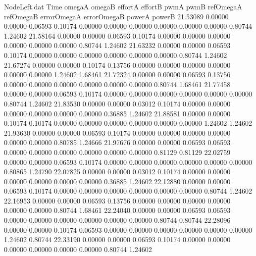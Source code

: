 \begin{filecontents}{NodeLeft.dat}
Time omegaA omegaB effortA effortB pwmA pwmB refOmegaA refOmegaB errorOmegaA errorOmegaB powerA powerB
  21.53089    0.00000    0.00000     0.06593    0.10174    0.00000    0.00000    0.00000    0.00000    0.00000    0.00000    0.80744    1.24602
  21.58164    0.00000    0.00000     0.06593    0.10174    0.00000    0.00000    0.00000    0.00000    0.00000    0.00000    0.80744    1.24602
  21.63232    0.00000    0.00000     0.06593    0.10174    0.00000    0.00000    0.00000    0.00000    0.00000    0.00000    0.80744    1.24602
  21.67274    0.00000    0.00000     0.10174    0.13756    0.00000    0.00000    0.00000    0.00000    0.00000    0.00000    1.24602    1.68461
  21.72324    0.00000    0.00000     0.06593    0.13756    0.00000    0.00000    0.00000    0.00000    0.00000    0.00000    0.80744    1.68461
  21.77458    0.00000    0.00000     0.06593    0.10174    0.00000    0.00000    0.00000    0.00000    0.00000    0.00000    0.80744    1.24602
  21.83530    0.00000    0.00000     0.03012    0.10174    0.00000    0.00000    0.00000    0.00000    0.00000    0.00000    0.36885    1.24602
  21.88581    0.00000    0.00000     0.10174    0.10174    0.00000    0.00000    0.00000    0.00000    0.00000    0.00000    1.24602    1.24602
  21.93630    0.00000    0.00000     0.06593    0.10174    0.00000    0.00000    0.00000    0.00000    0.00000    0.00000    0.80785    1.24666
  21.97676    0.00000    0.00000     0.06593    0.06593    0.00000    0.00000    0.00000    0.00000    0.00000    0.00000    0.81129    0.81129
  22.02759    0.00000    0.00000     0.06593    0.10174    0.00000    0.00000    0.00000    0.00000    0.00000    0.00000    0.80865    1.24790
  22.07825    0.00000    0.00000     0.03012    0.10174    0.00000    0.00000    0.00000    0.00000    0.00000    0.00000    0.36885    1.24602
  22.12880    0.00000    0.00000     0.06593    0.10174    0.00000    0.00000    0.00000    0.00000    0.00000    0.00000    0.80744    1.24602
  22.16953    0.00000    0.00000     0.06593    0.13756    0.00000    0.00000    0.00000    0.00000    0.00000    0.00000    0.80744    1.68461
  22.24040    0.00000    0.00000     0.06593    0.06593    0.00000    0.00000    0.00000    0.00000    0.00000    0.00000    0.80744    0.80744
  22.28096    0.00000    0.00000     0.10174    0.06593    0.00000    0.00000    0.00000    0.00000    0.00000    0.00000    1.24602    0.80744
  22.33190    0.00000    0.00000     0.06593    0.10174    0.00000    0.00000    0.00000    0.00000    0.00000    0.00000    0.80744    1.24602

\end{filecontents}
